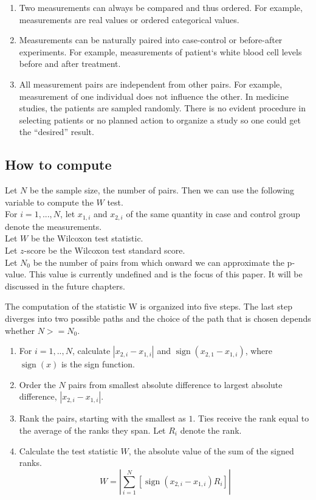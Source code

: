 \documentclass[12pt]{article}
\DeclareMathOperator{\sign}{sign}
\begin{document}
{\begin{enumerate}
  \item Two measurements can always be compared and thus ordered. For example, measurements are real values or ordered categorical values.
  \item Measurements can be naturally paired into case-control or before-after experiments. For example, measurements of patient`s white blood cell levels before and after treatment.
  \item All measurement pairs are independent from other pairs. For example, measurement of one individual does not influence the other. In medicine studies, the patients are sampled randomly. There is no evident procedure in selecting patients or no planned action to organize a study so one could get the ``desired'' result.
\end{enumerate}

\subsection{How to compute}
Let $N$ be the sample size, the number of pairs. Then we can use the following variable to compute the $W$ test. \\For $i=1,...,N$, let $x_{1, i}$ and $x_{2, i}$ of the same quantity in case and control group denote the measurements. \\
Let $W$ be the Wilcoxon test statistic. \\
Let $z$-score be the Wilcoxon test standard score. \\
Let $N_0$ be the number of pairs from which onward we can approximate the p-value. This value is currently undefined and is the focus of this paper. It will be discussed in the future chapters.

The computation of the statistic W is organized into five steps. The last step diverges into two possible paths and the choice of the path that is chosen depends whether $N  >= N_0$.

\begin{enumerate}
\item
For $i=1, .., N$, calculate $|x_{2,i} - x_{1,i}|$ and $\sign(x_{2,1} - x_{1,i})$, where $\sign(x)$ is the sign function.
\item
Order the $N$ pairs from smallest absolute difference to largest absolute difference, $|x_{2,i} - x_{1,i}|$.
\item
Rank the pairs, starting with the smallest as $1$. Ties receive the rank equal to the average of the ranks they span. Let $R_i$ denote the rank.
\item
Calculate the test statistic $W$, the absolute value of the sum of the signed ranks.
\begin{equation}
  W= \left|  \sum\limits_{i=1}^{N} \left[ \sign(x_{2,i} - x_{1,i})R_i \right] \right|
\end{equation}


\end{enumerate}}
\end{document}
